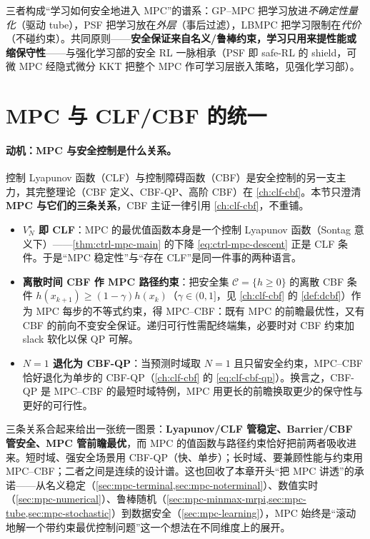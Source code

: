 \begin{insight}
三者构成“学习如何安全地进入 MPC”的谱系：GP--MPC 把学习放进\emph{不确定性量化}（驱动 tube），PSF 把学习放在\emph{外层}（事后过滤），LBMPC 把学习限制在\emph{代价}（不碰约束）。共同原则——\textbf{安全保证来自名义/鲁棒约束，学习只用来提性能或缩保守性}——与强化学习部的安全 RL 一脉相承（PSF 即 safe-RL 的 shield，可微 MPC 经隐式微分 KKT 把整个 MPC 作可学习层嵌入策略，见强化学习部）。
\end{insight}

\section{MPC 与 CLF/CBF 的统一}
\label{sec:mpc-clf-cbf}

\paragraph{动机：MPC 与安全控制是什么关系。}
控制 Lyapunov 函数（CLF）与控制障碍函数（CBF）是安全控制的另一支主力，其完整理论（CBF 定义、CBF-QP、高阶 CBF）在 \cref{ch:clf-cbf}。本节只澄清\textbf{MPC 与它们的三条关系}，CBF 主证一律引用 \cref{ch:clf-cbf}，不重铺。

\begin{itemize}
  \item \textbf{$V_N^\star$ 即 CLF}：MPC 的最优值函数本身是一个控制 Lyapunov 函数（Sontag 意义下）——\cref{thm:ctrl-mpc-main} 的下降 \cref{eq:ctrl-mpc-descent} 正是 CLF 条件。于是“MPC 稳定性”与“存在 CLF”是同一件事的两种语言。
  \item \textbf{离散时间 CBF 作 MPC 路径约束}：把安全集 $\mathcal C=\{h\ge0\}$ 的离散 CBF 条件 $h(x_{k+1})\ge(1-\gamma)h(x_k)$（$\gamma\in(0,1]$，见 \cref{ch:clf-cbf} 的 \cref{def:dcbf}）作为 MPC 每步的不等式约束，得 MPC--CBF：既有 MPC 的前瞻最优性，又有 CBF 的前向不变安全保证。递归可行性需配终端集，必要时对 CBF 约束加 slack 软化以保 QP 可解。
  \item \textbf{$N=1$ 退化为 CBF-QP}：当预测时域取 $N=1$ 且只留安全约束，MPC--CBF 恰好退化为单步的 CBF-QP（\cref{ch:clf-cbf} 的 \cref{eq:clf-cbf-qp}）。换言之，CBF-QP 是 MPC--CBF 的最短时域特例，MPC 用更长的前瞻换取更少的保守性与更好的可行性。
\end{itemize}

\begin{insight}
三条关系合起来给出一张统一图景：\textbf{Lyapunov/CLF 管稳定、Barrier/CBF 管安全、MPC 管前瞻最优}，而 MPC 的值函数与路径约束恰好把前两者吸收进来。短时域、强安全场景用 CBF-QP（快、单步）；长时域、要兼顾性能与约束用 MPC--CBF；二者之间是连续的设计谱。这也回收了本章开头“把 MPC 讲透”的承诺——从名义稳定（\cref{sec:mpc-terminal,sec:mpc-noterminal}）、数值实时（\cref{sec:mpc-numerical}）、鲁棒随机（\cref{sec:mpc-minmax-mrpi,sec:mpc-tube,sec:mpc-stochastic}）到数据安全（\cref{sec:mpc-learning}），MPC 始终是“滚动地解一个带约束最优控制问题”这一个想法在不同维度上的展开。
\end{insight}

